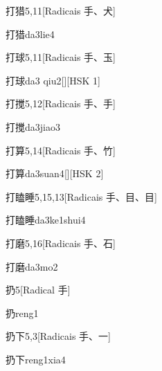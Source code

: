 \begin{entry}{打猎}{5,11}[Radicais ⼿、⽝]
  \begin{phonetics}{打猎}{da3lie4}
  \end{phonetics}
\end{entry}

\begin{entry}{打球}{5,11}[Radicais ⼿、⽟]
  \begin{phonetics}{打球}{da3 qiu2}[][HSK 1]
  \end{phonetics}
\end{entry}

\begin{entry}{打搅}{5,12}[Radicais ⼿、⼿]
  \begin{phonetics}{打搅}{da3jiao3}
  \end{phonetics}
\end{entry}

\begin{entry}{打算}{5,14}[Radicais ⼿、⽵]
  \begin{phonetics}{打算}{da3suan4}[][HSK 2]
  \end{phonetics}
\end{entry}

\begin{entry}{打瞌睡}{5,15,13}[Radicais ⼿、⽬、⽬]
  \begin{phonetics}{打瞌睡}{da3ke1shui4}
  \end{phonetics}
\end{entry}

\begin{entry}{打磨}{5,16}[Radicais ⼿、⽯]
  \begin{phonetics}{打磨}{da3mo2}
  \end{phonetics}
\end{entry}

\begin{entry}{扔}{5}[Radical ⼿]
  \begin{phonetics}{扔}{reng1}
  \end{phonetics}
\end{entry}

\begin{entry}{扔下}{5,3}[Radicais ⼿、⼀]
  \begin{phonetics}{扔下}{reng1xia4}
  \end{phonetics}
\end{entry}


